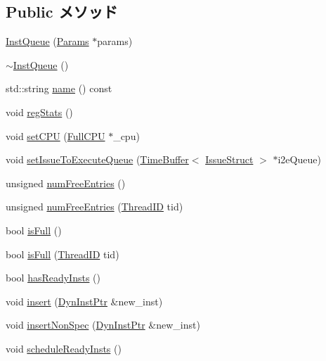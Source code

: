 \subsection*{Public メソッド}
\begin{DoxyCompactItemize}
\item 
\hyperlink{classInstQueue_a679ee5512f178ea331ab7cd3ebf2aa78}{InstQueue} (\hyperlink{classInstQueue_a818e103eae798a24a06a0a34631849ea}{Params} $\ast$params)
\item 
\hyperlink{classInstQueue_aac3885a1c3df6261e14208fc83713c17}{$\sim$InstQueue} ()
\item 
std::string \hyperlink{classInstQueue_a37627d5d5bba7f4a8690c71c2ab3cb07}{name} () const 
\item 
void \hyperlink{classInstQueue_a4dc637449366fcdfc4e764cdf12d9b11}{regStats} ()
\item 
void \hyperlink{classInstQueue_aa783e99c55fd8695cb33c087d14bece0}{setCPU} (\hyperlink{classInstQueue_a90ba84e54618cc07f2e8f05e046cb5ce}{FullCPU} $\ast$\_\-cpu)
\item 
void \hyperlink{classInstQueue_a7cbe625b8c47621898e7ca92d70c826b}{setIssueToExecuteQueue} (\hyperlink{classTimeBuffer}{TimeBuffer}$<$ \hyperlink{structIssueStruct}{IssueStruct} $>$ $\ast$i2eQueue)
\item 
unsigned \hyperlink{classInstQueue_a028971a565aca048c67ea1c36a6a9d51}{numFreeEntries} ()
\item 
unsigned \hyperlink{classInstQueue_acc878f608deead5b5319a6a3f98b50c8}{numFreeEntries} (\hyperlink{base_2types_8hh_ab39b1a4f9dad884694c7a74ed69e6a6b}{ThreadID} tid)
\item 
bool \hyperlink{classInstQueue_a3e70330939fdfc4dbc2f60c1a660584d}{isFull} ()
\item 
bool \hyperlink{classInstQueue_a30fac732df9b3fda011c7329a112cb31}{isFull} (\hyperlink{base_2types_8hh_ab39b1a4f9dad884694c7a74ed69e6a6b}{ThreadID} tid)
\item 
bool \hyperlink{classInstQueue_ae59aad9cee1e45b5817a9d96553e4567}{hasReadyInsts} ()
\item 
void \hyperlink{classInstQueue_a786595aecf8ab7aae40868b5ac4a79a7}{insert} (\hyperlink{classInstQueue_a028ce10889c5f6450239d9e9a7347976}{DynInstPtr} \&new\_\-inst)
\item 
void \hyperlink{classInstQueue_a4f7523e76440d88096a4eac14f2e0dd3}{insertNonSpec} (\hyperlink{classInstQueue_a028ce10889c5f6450239d9e9a7347976}{DynInstPtr} \&new\_\-inst)
\item 
void \hyperlink{classInstQueue_a3694e72427d3a616808797f9343d1fc4}{scheduleReadyInsts} ()

\end{DoxyCompactItemize}
